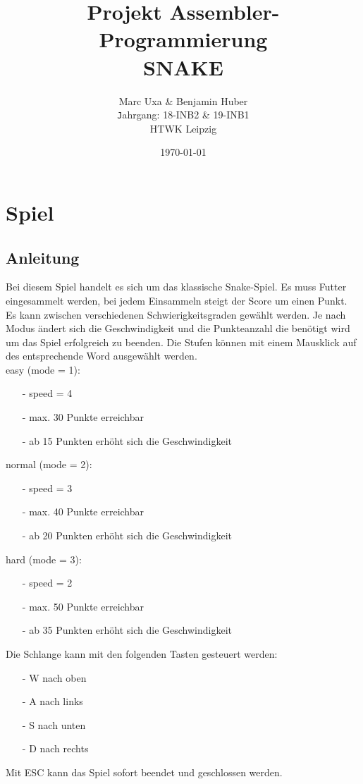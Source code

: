\documentclass[a4paper,10pt]{article}
\title{
	Projekt Assembler-Programmierung \\
	SNAKE
}
\author{
	\Large Marc Uxa \& Benjamin Huber \\[2mm]
	\texttt Jahrgang: 18-INB2 \& 19-INB1 \\
	\normalsize HTWK Leipzig \\
}
\date{\today}
\begin{document}
	\maketitle
	\thispagestyle{empty}
	\newpage
	
	\setcounter{page}{1}
	\tableofcontents
	\newpage
	
	\section{Spiel}
		\subsection{Anleitung}
			
			Bei diesem Spiel handelt es sich um das klassische Snake-Spiel. Es 
			muss 
			Futter eingesammelt werden, bei jedem Einsammeln steigt der Score 
			um einen Punkt.\\
			Es kann zwischen verschiedenen Schwierigkeitsgraden gewählt werden. 
			Je nach Modus ändert sich die Geschwindigkeit und die Punkteanzahl 
			die benötigt wird um das Spiel erfolgreich zu beenden. Die Stufen 
			können mit einem Mausklick auf des entsprechende Word ausgewählt 
			werden.\\
			easy (mode = 1):
			\begin{itemize}
				\item[-] speed = 4
				\item[-] max. 30 Punkte erreichbar
				\item[-] ab 15 Punkten erhöht sich die Geschwindigkeit 
			\end{itemize}
			normal (mode = 2):
			\begin{itemize}
				\item[-] speed = 3
				\item[-] max. 40 Punkte erreichbar
				\item[-] ab 20 Punkten erhöht sich die Geschwindigkeit 
			\end{itemize}
			hard (mode = 3):
			\begin{itemize}
				\item[-] speed = 2
				\item[-] max. 50 Punkte erreichbar
				\item[-] ab 35 Punkten erhöht sich die Geschwindigkeit 
			\end{itemize}
			Die Schlange kann mit den folgenden Tasten gesteuert werden:
			\begin{itemize}
				\item[-] W nach oben
				\item[-] A nach links
				\item[-] S nach unten
				\item[-] D nach rechts
			\end{itemize}
			Mit ESC kann das Spiel sofort beendet und geschlossen werden.
\end{document}
